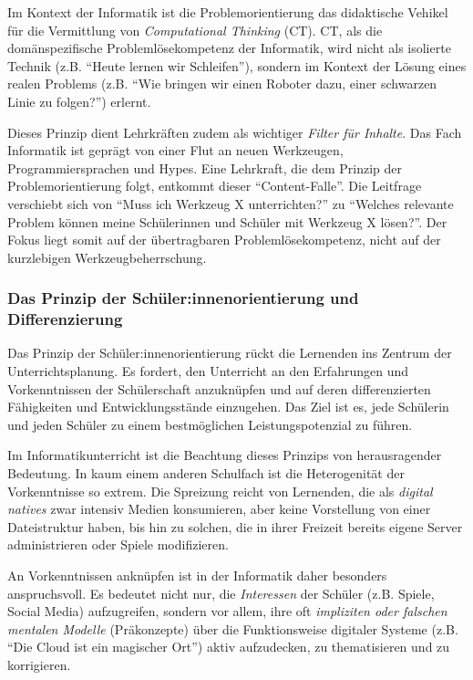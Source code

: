 \documentclass[a5paper,pagesize,10pt,bibtotoc,pointlessnumbers,
normalheadings,DIV=9,twoside=false]{scrbook}
\begin{document}
Im Kontext der Informatik ist die Problemorientierung das didaktische Vehikel für die Vermittlung von \textit{Computational Thinking} (CT). CT, als die domänspezifische Problemlösekompetenz der Informatik, wird nicht als isolierte Technik (z.B. ``Heute lernen wir Schleifen''), sondern im Kontext der Lösung eines realen Problems (z.B. ``Wie bringen wir einen Roboter dazu, einer schwarzen Linie zu folgen?'') erlernt.

Dieses Prinzip dient Lehrkräften zudem als wichtiger \textit{Filter für Inhalte}. Das Fach Informatik ist geprägt von einer Flut an neuen Werkzeugen, Programmiersprachen und Hypes. Eine Lehrkraft, die dem Prinzip der Problemorientierung folgt, entkommt dieser ``Content-Falle''. Die Leitfrage verschiebt sich von ``Muss ich Werkzeug X unterrichten?'' zu ``Welches relevante Problem können meine Schülerinnen und Schüler mit Werkzeug X lösen?''. Der Fokus liegt somit auf der übertragbaren Problemlösekompetenz, nicht auf der kurzlebigen Werkzeugbeherrschung.

\subsubsection{Das Prinzip der Schüler:innenorientierung und Differenzierung}

Das Prinzip der Schüler:innenorientierung rückt die Lernenden ins Zentrum der Unterrichtsplanung. Es fordert, den Unterricht an den Erfahrungen und Vorkenntnissen der Schülerschaft anzuknüpfen und auf deren differenzierten Fähigkeiten und Entwicklungsstände einzugehen. Das Ziel ist es, jede Schülerin und jeden Schüler zu einem bestmöglichen Leistungspotenzial zu führen.
    
Im Informatikunterricht ist die Beachtung dieses Prinzips von herausragender Bedeutung. In kaum einem anderen Schulfach ist die Heterogenität der Vorkenntnisse so extrem. Die Spreizung reicht von Lernenden, die als \textit{digital natives} zwar intensiv Medien konsumieren, aber keine Vorstellung von einer Datei\-struktur haben, bis hin zu solchen, die in ihrer Freizeit bereits eigene Server administrieren oder Spiele modifizieren.
    
An Vorkenntnissen anknüpfen ist in der Informatik daher besonders anspruchsvoll. Es bedeutet nicht nur, die \textit{Interessen} der Schüler (z.B. Spiele, Social Media) aufzugreifen, sondern vor allem, ihre oft \textit{impliziten oder falschen mentalen Modelle} (Präkonzepte) über die Funktionsweise digitaler Systeme (z.B. ``Die Cloud ist ein magischer Ort'') aktiv aufzudecken, zu thematisieren und zu korrigieren.
    
\end{document}
